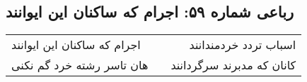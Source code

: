 \begin{center}
\section*{رباعی شماره ۵۹: اجرام که ساکنان این ایوانند}
\label{sec:sh059}
\begin{longtable}{l p{0.5cm} r}
اجرام که ساکنان این ایوانند
&&
اسباب تردد خردمندانند
\\
هان تاسر رشته خرد گم نکنی
&&
کانان که مدبرند سرگردانند
\\
\end{longtable}
\end{center}
